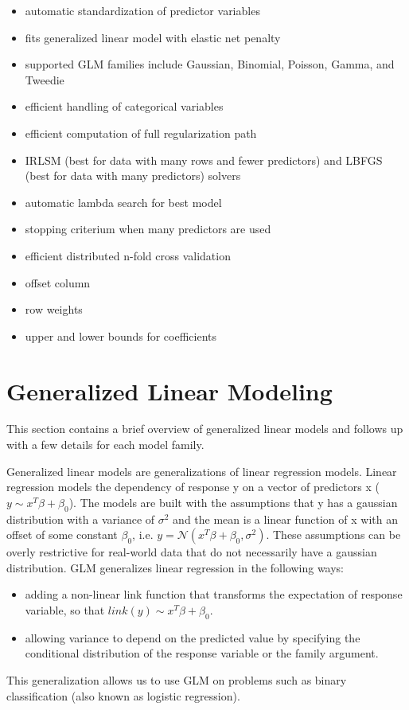 \begin{itemize} 
\item automatic standardization of predictor variables
\item fits generalized linear model with elastic net penalty
\item supported GLM families include Gaussian, Binomial, Poisson, Gamma, and Tweedie
\item efficient handling of categorical variables
\item efficient computation of full regularization path
\item IRLSM (best for data with many rows and fewer predictors) and LBFGS (best for data with many predictors) solvers
\item automatic lambda search for best model
\item stopping criterium when many predictors are used
\item efficient distributed n-fold cross validation
\item offset column
\item row weights
\item upper and lower bounds for coefficients
\end{itemize}



\section{Generalized Linear Modeling} 
This section contains a brief overview of generalized linear models and follows up with a few details for each model family.

Generalized linear models are generalizations of linear regression models. Linear regression models the dependency of response y on a vector of predictors x ($y \sim x^T \beta + \beta_0$). The models are built with the assumptions that y has a gaussian distribution with a variance of $\sigma^2$ and the mean is a linear function of x with an offset of some constant $\beta_0$, i.e. $ y = \mathcal{N}(x^T \beta + \beta_0 ,  \sigma^2) $. These assumptions can be overly restrictive for real-world data that do not necessarily have a gaussian distribution. GLM generalizes linear regression in the following ways: 
\begin{itemize} 
\item adding a non-linear link function that transforms the expectation of response variable, so that $link(y) \sim x^T \beta + \beta_0$.
\item allowing variance to depend on the predicted value by specifying the conditional distribution of the response variable or the family argument.

\end{itemize}
This generalization allows us to use GLM on problems such as binary classification (also known as logistic regression).

